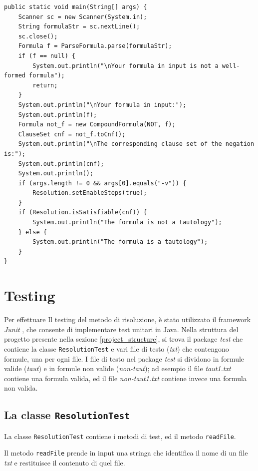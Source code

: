 \documentclass[a4paper,12pt]{report}
\begin{document}
\begin{minipage}{\linewidth}
    \small
    \begin{lstlisting}[caption={Metodo \texttt{main} della classe \texttt{App}}, label={method:main}]
public static void main(String[] args) {
    Scanner sc = new Scanner(System.in);
    String formulaStr = sc.nextLine();
    sc.close();
    Formula f = ParseFormula.parse(formulaStr);
    if (f == null) {
        System.out.println("\nYour formula in input is not a well-formed formula");
        return;
    }
    System.out.println("\nYour formula in input:");
    System.out.println(f);
    Formula not_f = new CompoundFormula(NOT, f);
    ClauseSet cnf = not_f.toCnf();  
    System.out.println("\nThe corresponding clause set of the negation is:");
    System.out.println(cnf);
    System.out.println();
    if (args.length != 0 && args[0].equals("-v")) {
        Resolution.setEnableSteps(true);
    }
    if (Resolution.isSatisfiable(cnf)) {
        System.out.println("The formula is not a tautology");
    } else {
        System.out.println("The formula is a tautology");
    }
}
    \end{lstlisting}
\end{minipage}
% 
% 
\chapter{Testing}
\label{testing}
Per effettuare Il testing del metodo di risoluzione, è stato utilizzato il framework \emph{Junit} \cite{junit5}, che consente di implementare test unitari in Java. Nella struttura del progetto presente nella sezione \ref{project_structure}, si trova il package \emph{test} che contiene la classe \texttt{ResolutionTest} e vari file di testo (\emph{txt}) che contengono formule, una per ogni file. I file di testo nel package \emph{test} si dividono in formule valide (\emph{taut}) e in formule non valide (\emph{non-taut}); ad esempio il file \emph{taut1.txt} contiene una formula valida, ed il file \emph{non-taut1.txt} contiene invece una formula non valida.

\section{La classe \texttt{ResolutionTest}}
La classe \texttt{ResolutionTest} contiene i metodi di test, ed il metodo \texttt{readFile}.

Il metodo \texttt{readFile} prende in input una stringa che identifica il nome di un file \emph{txt} e restituisce il contenuto di quel file.
\end{document}
